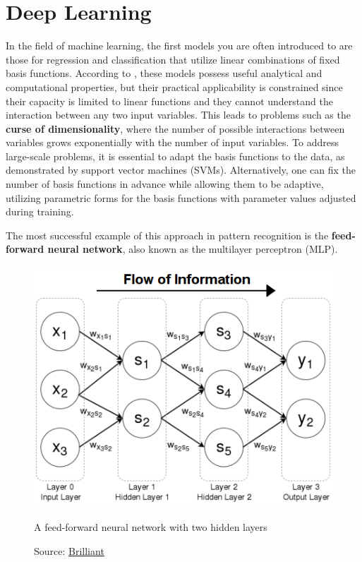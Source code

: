 \section{Deep Learning}
\label{sec:dl}

In the field of machine learning, the first models you
are often introduced to are those for regression
and classification that utilize linear
combinations of fixed basis functions.
According to \cite{Bishop:2008aa},
these models possess useful analytical and computational properties,
but their practical applicability is constrained 
since their capacity is limited to linear functions
and they cannot understand the interaction between any two input variables.
This leads to problems such as the \textbf{curse of dimensionality},
where the number of possible interactions between variables grows exponentially
with the number of input variables.
To address large-scale problems, it is essential to adapt the basis functions
to the data, as demonstrated by support vector machines (SVMs).
Alternatively, one can fix the number of basis functions in advance while
allowing them to be adaptive, utilizing parametric forms for the basis
functions with parameter values adjusted during training.

The most successful example of this approach in pattern recognition is the
\textbf{feed-forward neural network},
also known as the multilayer perceptron (MLP).
\begin{figure}[h]
    \centering
    \includegraphics[width=.75\textwidth]{figures/ch3/1.mlp.png}
    \caption{A feed-forward neural network with two hidden layers}
    \vspace{-10px}
    \caption*{\scriptsize{Source: \href{https://brilliant.org/wiki/feedforward-neural-networks/}{Brilliant}}}
    \label{fig:mlp}
\end{figure}

